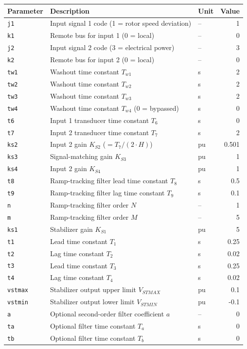 \begin{tabularx}{\linewidth}{@{}l X l r@{}}
\toprule
\textbf{Parameter} & \textbf{Description} & \multicolumn{1}{c}{\textbf{Unit}} & \multicolumn{1}{c}{\textbf{Value}} \\
\midrule
\texttt{j1} & Input signal 1 code (1 = rotor speed deviation) & -- & 1 \\
\texttt{k1} & Remote bus for input 1 (0 = local) & -- & 0 \\
\texttt{j2} & Input signal 2 code (3 = electrical power) & -- & 3 \\
\texttt{k2} & Remote bus for input 2 (0 = local) & -- & 0 \\
\texttt{tw1} & Washout time constant $T_{w1}$ & s & 2 \\
\texttt{tw2} & Washout time constant $T_{w2}$ & s & 2 \\
\texttt{tw3} & Washout time constant $T_{w3}$ & s & 2 \\
\texttt{tw4} & Washout time constant $T_{w4}$ (0 = bypassed) & s & 0 \\
\texttt{t6} & Input 1 transducer time constant $T_6$ & s & 0 \\
\texttt{t7} & Input 2 transducer time constant $T_7$ & s & 2 \\
\texttt{ks2} & Input 2 gain $K_{S2}$ ($= T_7 / (2 \cdot H)$) & pu & 0.501 \\
\texttt{ks3} & Signal-matching gain $K_{S3}$ & pu & 1 \\
\texttt{ks4} & Input 2 gain $K_{S4}$ & pu & 1 \\
\texttt{t8} & Ramp-tracking filter lead time constant $T_8$ & s & 0.5 \\
\texttt{t9} & Ramp-tracking filter lag time constant $T_9$ & s & 0.1 \\
\texttt{n} & Ramp-tracking filter order $N$ & -- & 1 \\
\texttt{m} & Ramp-tracking filter order $M$ & -- & 5 \\
\texttt{ks1} & Stabilizer gain $K_{S1}$ & pu & 5 \\
\texttt{t1} & Lead time constant $T_1$ & s & 0.25 \\
\texttt{t2} & Lag time constant $T_2$ & s & 0.02 \\
\texttt{t3} & Lead time constant $T_3$ & s & 0.25 \\
\texttt{t4} & Lag time constant $T_4$ & s & 0.02 \\
\texttt{vstmax} & Stabilizer output upper limit $V_{STMAX}$ & pu & 0.1 \\
\texttt{vstmin} & Stabilizer output lower limit $V_{STMIN}$ & pu & -0.1 \\
\texttt{a} & Optional second-order filter coefficient $a$ & -- & 0 \\
\texttt{ta} & Optional filter time constant $T_a$ & s & 0 \\
\texttt{tb} & Optional filter time constant $T_b$ & s & 0 \\
\bottomrule
\end{tabularx}
